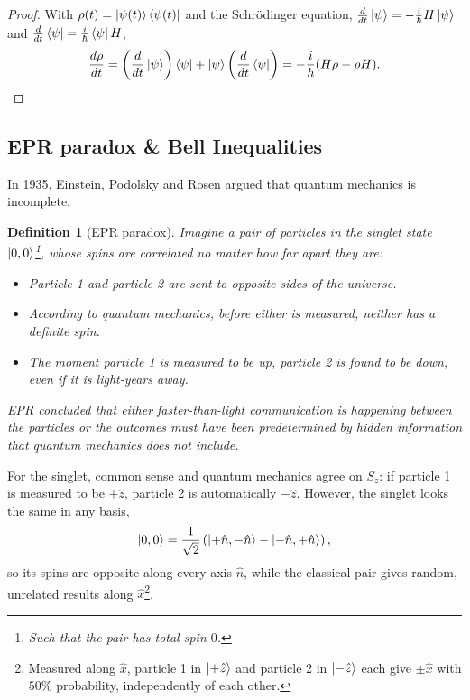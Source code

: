 \documentclass{article}
\newtheorem{definition}{Definition}
\begin{document}
\begin{proof}
    With $\rho(t) = \ket{\psi(t)}\bra{\psi(t)}$ and the Schrödinger equation, $\frac{d}{dt}\ket{\psi} = -\frac{i}{\hbar}H\ket{\psi}$ and $\frac{d}{dt}\bra{\psi} = \frac{i}{\hbar}\bra{\psi}H$,
    \begin{equation*}
        \frac{d\rho}{dt} = \left(\frac{d}{dt}\ket{\psi}\right)\bra{\psi} + \ket{\psi}\left(\frac{d}{dt}\bra{\psi}\right) = -\frac{i}{\hbar}(H\rho - \rho H).
    \end{equation*}
\end{proof}

\subsection{EPR paradox \& Bell Inequalities}
In 1935, Einstein, Podolsky and Rosen argued that quantum mechanics is incomplete.
\begin{definition}[EPR paradox]
    Imagine a pair of particles in the singlet state $\ket{0,0}$\footnote{Such that the pair has total spin $0$.}, whose spins are correlated no matter how far apart they are:
    \begin{itemize}
        \item Particle 1 and particle 2 are sent to opposite sides of the universe.
        \item According to quantum mechanics, before either is measured, neither has a definite spin.
        \item The moment particle 1 is measured to be up, particle 2 is found to be down, even if it is light-years away.
    \end{itemize}
    EPR concluded that either faster-than-light communication is happening between the particles or the outcomes must have been predetermined by hidden information that quantum mechanics does not include.
\end{definition}
For the singlet, common sense and quantum mechanics agree on $S_z$: if particle 1 is measured to be $+\hat{z}$, particle 2 is automatically $-\hat{z}$. However, the singlet looks the same in any basis,
\begin{equation*}
    \ket{0,0} = \frac{1}{\sqrt{2}}\left(\ket{+\hat{n},-\hat{n}} - \ket{-\hat{n},+\hat{n}}\right),
\end{equation*}
so its spins are opposite along every axis $\hat{n}$, while the classical pair gives random, unrelated results along $\hat{x}$\footnote{Measured along $\hat{x}$, particle 1 in $\ket{+\hat{z}}$ and particle 2 in $\ket{-\hat{z}}$ each give $\pm\hat{x}$ with $50\%$ probability, independently of each other.}.
\end{document}
